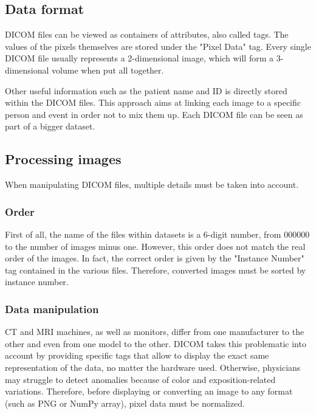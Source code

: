 \subsection{Data format}
\setlength{\marginparwidth}{3cm}\leavevmode {}DICOM files can be viewed as containers of attributes, also called tags. The values of the pixels themselves are stored under the "Pixel Data" tag. Every single DICOM file usually represents a 2-dimensional image, which will form a 3-dimensional volume when put all together.

Other useful information such as the patient name and ID is directly stored within the DICOM files. This approach aims at linking each image to a specific person and event in order not to mix them up. Each DICOM file can be seen as part of a bigger dataset. 


\subsection{Processing images}
\setlength{\marginparwidth}{3cm}\leavevmode {}When manipulating DICOM files, multiple details must be taken into account. 


\subsubsection{Order}
\setlength{\marginparwidth}{3cm}\leavevmode {}First of all, the name of the files within datasets is a 6-digit number, from 000000 to the number of images minus one. However, this order does not match the real order of the images. In fact, the correct order is given by the "Instance Number" tag contained in the various files. Therefore, converted images must be sorted by instance number. 


\subsubsection{Data manipulation}
\label{sec:dicom_data_manipulation}
\setlength{\marginparwidth}{3cm}\leavevmode {}CT and MRI machines, as well as monitors, differ from one manufacturer to the other and even from one model to the other. DICOM takes this problematic into account by providing specific tags that allow to display the exact same representation of the data, no matter the hardware used. Otherwise, physicians may struggle to detect anomalies because of color and exposition-related variations. 
Therefore, before displaying or converting an image to any format (such as PNG or NumPy array), pixel data must be normalized.

